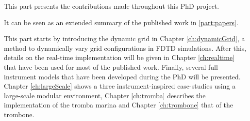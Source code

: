This part presents the contributions made throughout this PhD project.

It can be seen as an extended summary of the published work in \ref{part:papers}.

This part starts by introducing the dynamic grid in Chapter \ref{ch:dynamicGrid}, a method to dynamically vary grid configurations in FDTD simulations. After this, details on the real-time implementation will be given in Chapter \ref{ch:realtime} that have been used for most of the published work. 
Finally, several full instrument models that have been developed during the PhD will be presented. Chapter \ref{ch:largeScale} shows a three instrument-inspired case-studies using a large-scale modular environment, Chapter \ref{ch:tromba} describes the implementation of the tromba marina and Chapter \ref{ch:trombone} that of the trombone.

